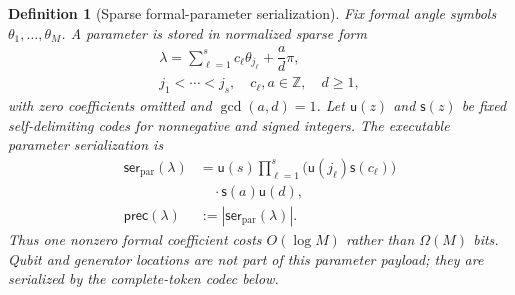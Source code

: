 \documentclass[a4paper,twocolumn,10pt,unpublished]{quantumarticle}
\newtheorem{definition}{Definition}
\newcommand{\pcharge}{\mathsf{prec}}
\begin{document}
\begin{definition}[Sparse formal-parameter serialization]
\label{def:parmodule}
Fix formal angle symbols $\theta_1,\ldots,\theta_M$.  A parameter is stored
in normalized sparse form
\begin{equation*}
\begin{gathered}
 \lambda=\displaystyle\sum_{\ell=1}^{s}c_\ell\theta_{j_\ell}
 +\dfrac{a}{d}\pi,\\
 j_1<\cdots<j_s,\quad c_\ell,a\in\mathbb Z,\quad d\geq1,
\end{gathered}
\end{equation*}
with zero coefficients omitted and $\gcd(a,d)=1$.  Let
$\mathsf{u}(z)$ and $\mathsf{s}(z)$ be fixed self-delimiting codes for
nonnegative and signed integers.  The executable parameter serialization is
\begin{equation}
\label{eq:precision-charge}
\begin{aligned}
 \mathsf{ser}_{\mathrm{par}}(\lambda)
 &=\mathsf{u}(s)\prod_{\ell=1}^{s}
   \bigl(\mathsf{u}(j_\ell)\mathsf{s}(c_\ell)\bigr)\\
 &\quad\cdot\mathsf{s}(a)\mathsf{u}(d),\\
 \pcharge(\lambda)&:=|\mathsf{ser}_{\mathrm{par}}(\lambda)|.
\end{aligned}
\end{equation}
Thus one nonzero formal coefficient costs $O(\log M)$ rather than
$\Omega(M)$ bits.  Qubit and generator locations are not part of this
parameter payload; they are serialized by the complete-token codec below.
\end{definition}
\end{document}
